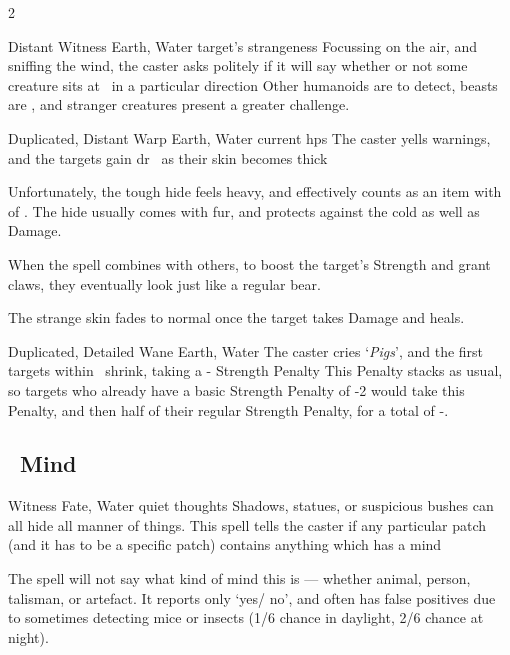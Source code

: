 \begin{multicols}{2}
{  


    {Distant}%
    {Witness}%
    {Earth, Water}%
    {target's strangeness}%
    {Focussing on the air, and sniffing the wind, the caster asks politely if it will say whether or not some creature sits at \spellRange\ in a particular direction}%
    {Other humanoids are \tn[7] to detect, beasts are \tn[9], and stranger creatures present a greater challenge.}


    {Duplicated, Distant}%
    {Warp}%
    {Earth, Water}%
    {current \glspl{hp}}%
    {The caster yells warnings, and the targets gain \gls{dr}~ as their skin becomes thick}%
    {Unfortunately, the tough hide feels heavy, and effectively counts as an item with  of .
    The hide usually comes with fur, and protects against the cold as well as Damage.

    When the spell combines with others, to boost the target's Strength and grant claws, they eventually look just like a regular bear.

    The strange skin fades to normal once the target takes Damage and heals.}

    {Duplicated, Detailed}%
    {Wane}%
    {Earth, Water}%
    {}%
    {The caster cries `\textit{Pigs}', and the first  targets within \spellRange\ shrink, taking a - Strength Penalty}%
    {
    This Penalty stacks as usual, so targets who already have a basic Strength Penalty of -2 would take this Penalty, and then half of their regular Strength Penalty, for a total of -.}

}

\subsection[Mind]{~Mind}
\label{mindSpells}



  {}%
  {Witness}%
  {Fate, Water}%
  {quiet thoughts}%
  {Shadows, statues, or suspicious bushes can all hide all manner of things.
  This spell tells the caster if any particular patch (and it has to be a specific patch) contains anything which has a mind}%
  {%
    The spell will not say what kind of mind this is --- whether animal, person, \gls{talisman}, or \gls{artefact}.
    It reports only `yes/ no', and often has false positives due to sometimes detecting mice or insects (1/6 chance in daylight, 2/6 chance at night).

}
\end{multicols}
